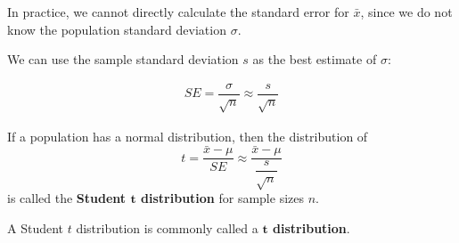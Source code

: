 \documentclass{beamer}
\begin{document}
\begin{frame}
  \begin{note}
    In practice, we cannot directly calculate the standard error for $\bar{x}$, since we do not know the population standard deviation $\sigma$.\pause

    \vspace{1mm}
    We can use the sample standard deviation $s$ as the best estimate of $\sigma$:

    \vspace{-2mm}
    \begin{equation*}
      \begin{aligned}
        SE = \dfrac{\sigma}{\sqrt{n}}\approx\dfrac{s}{\sqrt{n}}
      \end{aligned}
    \end{equation*}
  \end{note}\pause
  
  \begin{definition}
    If a population has a normal distribution, then the distribution of 
    \begin{equation*}
      t = \dfrac{\bar{x}-\mu}{SE} \approx \dfrac{ \bar{x}-\mu }{ \dfrac{s}{ \sqrt{n} } }
    \end{equation*}
    is called the \textbf{Student $\boldsymbol{t}$ distribution} for sample sizes $n$.
  \end{definition}\pause

  \begin{note}
    A Student $t$ distribution is commonly called a \textbf{$\boldsymbol{t}$ distribution}.
  \end{note}
\end{frame}
\end{document}
